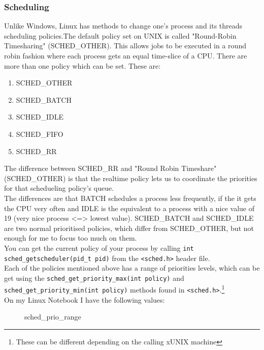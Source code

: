 \subsubsection{Scheduling}
Unlike Windows, Linux has methods to change one's process and its threads scheduling policies.The default policy set on UNIX
is called "Round-Robin Timesharing" (SCHED\_OTHER). This allows jobs to be executed in a round robin fashion where
each process gets an equal time-slice of a CPU. There are more than one policy which can be set.
These are:
\begin{enumerate}
	\item SCHED\_OTHER
	\item SCHED\_BATCH
	\item SCHED\_IDLE
	\item SCHED\_FIFO
	\item SCHED\_RR
\end{enumerate}
The difference between SCHED\_RR and "Round Robin Timeshare"(SCHED\_OTHER) is that the realtime policy lets
us to coordinate the priorities for that schedueling policy's queue.\\
The differences are that BATCH schedules a process less
frequently, if the it gets the CPU very often and IDLE is the equivalent to a process with a nice value of 19
(very nice process <=> lowest value).
SCHED\_BATCH and SCHED\_IDLE are two normal prioritised policies, which differ from SCHED\_OTHER, but
not enough for me to focus too much on them.\\
You can get the current policy of your process by calling \texttt{int sched\_getscheduler(pid\_t pid)} from the \texttt{<sched.h>} header file. 
\\
Each of the policies mentioned above has a range of priorities levels, which can be get using the \texttt{sched\_get\_priority\_max(int policy)} and \texttt{sched\_get\_priority\_min(int policy)} methods found in \texttt{<sched.h>}.\footnote{These can be different depending on the calling xUNIX
machine}\\
On my Linux Notebook I have the following values:
\begin{figure*}[!htb]
	\centering
	\caption{sched\_prio\_range} 
	\label{sched_prio_range}
\end{figure*}
